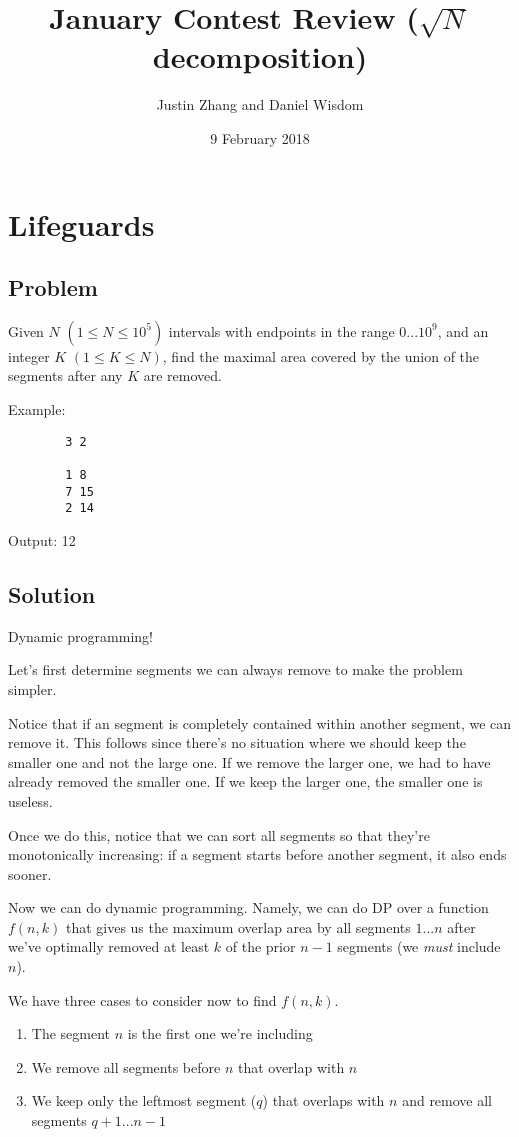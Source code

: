 \documentclass[11pt]{article}
\title{January Contest Review ($\sqrt{N}$ decomposition)}
\author{Justin Zhang and Daniel Wisdom}
\date{9 February 2018}
\begin{document}
\maketitle

\section{Lifeguards}

\subsection{Problem}
    Given $N$ $(1 \leq N \leq 10^5)$ intervals with endpoints in the range $0 ... 10^9$, and an integer $K$ $(1 \leq K \leq N)$, find the maximal area covered by the union of the segments after any $K$ are removed.
    
    Example:
    \begin{verbatim}
        3 2
        
        1 8
        7 15
        2 14\end{verbatim}
   
    Output: 12
    
\subsection{Solution}
    Dynamic programming!
    
    Let's first determine segments we can always remove to make the problem simpler.
    
    Notice that if an segment is completely contained within another segment, we can remove it. This follows since there's no situation where we should keep the smaller one and not the large one. If we remove the larger one, we had to have already removed the smaller one. If we keep the larger one, the smaller one is useless.
    
    Once we do this, notice that we can sort all segments so that they're monotonically increasing: if a segment starts before another segment, it also ends sooner.
    
    Now we can do dynamic programming. Namely, we can do DP over a function $f(n, k)$ that gives us the maximum overlap area by all segments $1 ... n$ after we've optimally removed at least $k$ of the prior $n-1$ segments (we \textit{must} include $n$).
    
    We have three cases to consider now to find $f(n, k)$. 
    
    \begin{enumerate}
        \item The segment $n$ is the first one we're including
        \item We remove all segments before $n$ that overlap with $n$
        \item We keep only the leftmost segment ($q$) that overlaps with $n$ and remove all segments $q+1 ... n-1$
    \end{enumerate}
    
\end{document}
